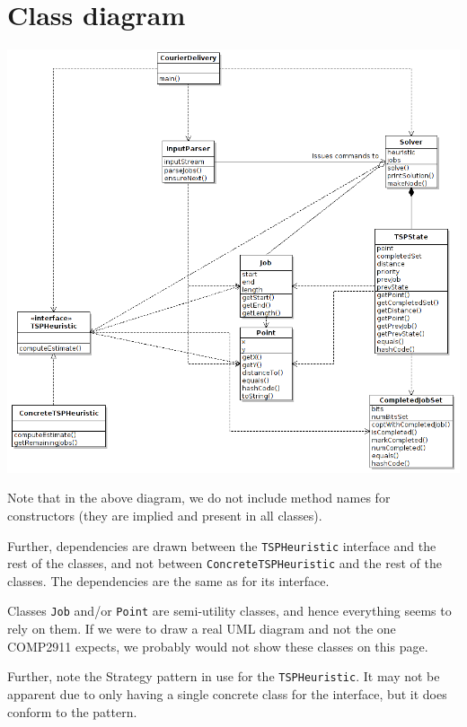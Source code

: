 \documentclass[a4paper,11pt]{article}
\begin{document}
\section*{Class diagram}

\includegraphics[scale=0.5]{uml.png}
\vspace{5mm}

Note that in the above diagram, we do not include method names for constructors
(they are implied and present in all classes).

Further, dependencies are drawn between the \texttt{TSPHeuristic} interface and
the rest of the classes, and not between \texttt{ConcreteTSPHeuristic} and the
rest of the classes. The dependencies are the same as for its interface.

Classes \texttt{Job} and/or \texttt{Point} are semi-utility classes, and hence
everything seems to rely on them. If we were to draw a real UML diagram and not
the one COMP2911 expects, we probably would not show these classes on this page.

Further, note the Strategy pattern in use for the \texttt{TSPHeuristic}. It may
not be apparent due to only having a single concrete class for the interface,
but it does conform to the pattern.
\end{document}
